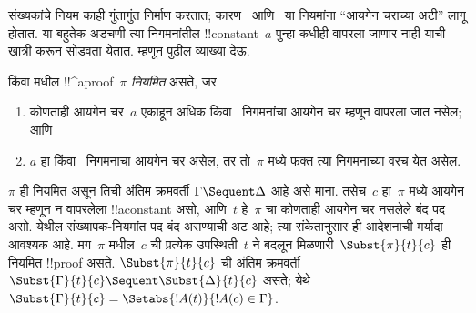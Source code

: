 \documentclass[../../../include/open-logic-section]{subfiles}
\begin{document}


संख्यकांचे नियम काही गुंतागुंत निर्माण करतात;
कारण~\LeftR{\lexists} आणि~\RightR{\lforall} या
नियमांना ``आयगेन चराच्या अटी'' लागू होतात. या
बहुतेक अडचणी त्या निगमनांतील !!{constant}~$a$
पुन्हा कधीही वापरला जाणार नाही याची खात्री करून
सोडवता येतात. म्हणून पुढील व्याख्या देऊ.

\begin{defn}
 किंवा  मधील !!^a{proof}~$\pi$
\emph{नियमित} असते, जर
\begin{enumerate}
  \item कोणताही आयगेन चर~$a$ एकाहून अधिक
  \LeftR{\lexists} किंवा~\RightR{\lforall} निगमनांचा
  आयगेन चर म्हणून वापरला जात नसेल; आणि
  \item $a$ हा \LeftR{\lexists} किंवा~\RightR{\lforall}
  निगमनाचा आयगेन चर असेल, तर तो~$\pi$ मध्ये
  फक्त त्या निगमनाच्या वरच येत असेल.
\end{enumerate}
\end{defn}

\begin{lem} $\pi$ ही
नियमित असून तिची अंतिम क्रमवर्ती $\Gamma \Sequent
\Delta$ आहे असे माना. तसेच~$c$ हा~$\pi$ मध्ये
आयगेन चर म्हणून न वापरलेला !!a{constant} असो,
आणि~$t$ हे~$\pi$ चा कोणताही आयगेन चर नसलेले बंद पद असो.
येथील संख्यापक-नियमांत पद बंद असण्याची अट आहे;
त्या संकेतानुसार ही आदेशनाची मर्यादा आवश्यक आहे.
मग~$\pi$ मधील~$c$ ची प्रत्येक उपस्थिती~$t$ ने
बदलून मिळणारी~$\Subst{\pi}{t}{c}$ ही नियमित
!!{proof} असते. $\Subst{\pi}{t}{c}$ ची अंतिम क्रमवर्ती
$\Subst{\Gamma}{t}{c}
\Sequent \Subst{\Delta}{t}{c}$ असते; येथे
$\Subst{\Gamma}{t}{c} =
\Setabs{!A(t)}{!A(c) \in \Gamma}$.
\end{lem}
\end{document}
